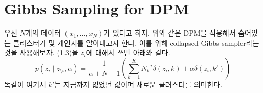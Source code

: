 \documentclass[a4paper, 10pt]{book}
\begin{document}
  \section{Gibbs Sampling for DPM}
    우선 $N$개의 데이터 $\left(x_{1},\ldots , x_{N}\right)$가 있다고 하자. 위와 같은 DPM을 적용해서 숨어있는 클러스터가 몇 개인지를 알아내고자 한다. 이를 위해 collapsed Gibbs sampler라는 것을 사용해보자. (1.3)을 $z_{i}$에 대해서 쓰면 아래와 같다.
    \begin{equation}
      p\left(z_{i}\;|\;z_{\setminus i},\alpha\right)=\frac{1}{\alpha+N-1}\left(\sum_{k=1}^{K}N_{k}^{-i}\delta\left(z_{i},k\right)+\alpha\delta\left(z_{i},k'\right)\right)
    \end{equation}
    똑같이 여기서 $k'$는 지금까지 없었던 값이며 새로운 클러스터를 의미한다. 
\end{document}
